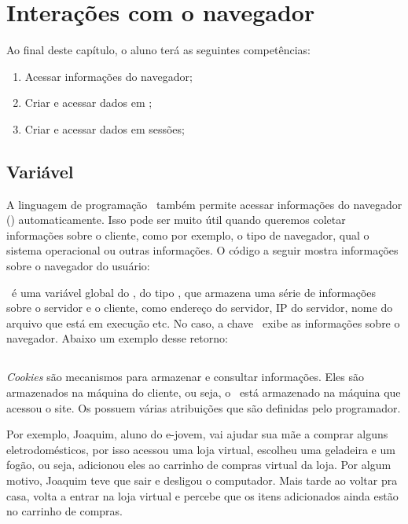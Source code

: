 \chapter{Interações com o navegador}
\label{interacoes-com-o-navegador}

Ao final deste capítulo, o aluno terá as seguintes competências:
\begin{enumerate}
    \item Acessar informações do navegador;
    \item Criar e acessar dados em \cookies;
    \item Criar e acessar dados em sessões;
\end{enumerate}

\section{Variável \variavelserver}
\label{variavel-server}

A linguagem de programação \php~também permite acessar informações do navegador 
(\browser) automaticamente. Isso pode ser muito útil quando queremos coletar 
informações sobre o cliente, como por exemplo, o tipo de navegador, qual o 
sistema operacional ou outras informações. O código a seguir mostra informações 
sobre o navegador do usuário:



\variavelserver~é uma variável global do \php, do tipo \tipoarray, que armazena uma série 
de informações sobre o servidor e o cliente, como endereço do servidor, IP do servidor, 
nome do arquivo que está em execução etc. No caso, a chave \chavehttp~exibe as informações 
sobre o navegador. Abaixo um exemplo desse retorno:

\section{\titulocookies}
\label{cookies}

\textit{Cookies} são mecanismos para armazenar e consultar informações. Eles são armazenados na máquina 
do cliente, ou seja, o \cookie~está armazenado na máquina que acessou o site. Os \cookies possuem várias 
atribuições que são definidas pelo programador.

Por exemplo, Joaquim, aluno do e-jovem, vai ajudar sua mãe a comprar alguns eletrodomésticos, 
por isso acessou uma loja virtual, escolheu uma geladeira e um fogão, ou seja, adicionou eles ao 
carrinho de compras virtual da loja. Por algum motivo, Joaquim teve que sair e desligou o computador. 
Mais tarde ao voltar pra casa, volta a entrar na loja virtual e percebe que os itens adicionados 
ainda estão no carrinho de compras.


